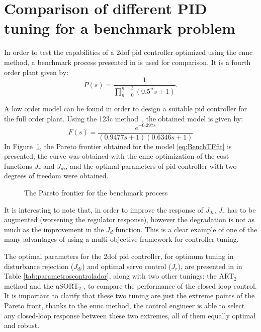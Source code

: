 \section{Comparison of different PID tuning for a benchmark problem}
\label{sec:Benchmark}%
In order to test the capabilities of a \gls{2dof} \gls{pid} controller optimized using the \gls{ennc} method, a benchmark process presented in \parencite{Astroem2000} is used for comparison. It is a fourth order plant given by:
\begin{equation}
P(s) = \frac{1}{\prod_{n=0}^{n=3}(0.5^n s+1)}.
\label{eq:benchmarkTF}
\end{equation}

A low order model can be found in order to design a suitable \gls{pid} controller for the full order plant. Using the 123c method~\parencite{Alfaro2006}, the obtained model is given by:
%
\begin{equation}
F(s)=\frac{e^{-0.297s}}{(0.9477s+1)(0.6346s+1)}
\label{eq:BenchTFfit}
\end{equation}
%
In Figure~\ref{fig:paretomodelo}, the Pareto frontier obtained for the model \eqref{eq:BenchTFfit} is presented, the curve was obtained with the \gls{ennc} optimization of the cost functions $J_r$ and $J_{di}$, and the optimal parameters of \gls{pid} controller with two degrees of freedom were obtained.%
%
\begin{figure}%
	\centering
	\caption{The Pareto frontier for the benchmark process}%
	\label{fig:paretomodelo}%
\end{figure}

It is interesting to note that, in order to improve the response of $J_{di}$, $J_{r}$ has to be augmented (worsening the regulator response), however the degradation is not as much as the improvement in the $J_{d}$ function. This is a clear example of one of the many advantages of using a multi-objective framework for controller tuning.

The optimal parameters for the \gls{2dof} \gls{pid} controller, for optimum tuning in disturbance rejection ($J_{di}$) and optimal servo control ($J_r$), are presented in in Table \ref{tab:parametroscontrolador}, along with two other tunings: the ART$_2$ method \parencite{Vilanova2011} and the uSORT$_2$ \parencite{Alfaro2012a}, to compare the performance of the closed loop control. It is important to clarify that these two tuning are just the extreme points of the Pareto front, thanks to the \gls{ennc} method, the control engineer is able to select any closed-loop response between these two extremes, all of them equally optimal and robust.

